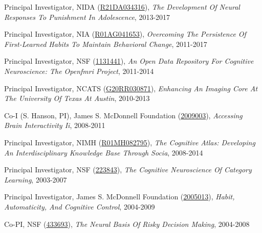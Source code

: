 Principal Investigator, NIDA (\href{http://projectreporter.nih.gov/project_info_description.cfm?aid=8662735}{R21DA034316}), \textit{The Development Of Neural Responses To Punishment In Adolescence}, 2013-2017 \vspace{2mm}

Principal Investigator, NIA (\href{http://projectreporter.nih.gov/project_info_description.cfm?aid=8968152}{R01AG041653}), \textit{Overcoming The Persistence Of First-Learned Habits To Maintain Behavioral Change}, 2011-2017 \vspace{2mm}

Principal Investigator, NSF (\href{http://grants.uberresearch.com/100000001/1131441/CRCNS-Data-Sharing-An-open-data-repository-for-cognitive-neuroscience-The-OpenfMRI-Project}{1131441}), \textit{An Open Data Repository For Cognitive Neuroscience: The Openfmri Project}, 2011-2014 \vspace{2mm}

Principal Investigator, NCATS (\href{http://projectreporter.nih.gov/project_info_description.cfm?aid=7934944}{G20RR030871}), \textit{Enhancing An Imaging Core At The University Of Texas At Austin}, 2010-2013 \vspace{2mm}

Co-I (S. Hanson, PI), James S. McDonnell Foundation (\href{https://www.jsmf.org/grants/2009003/}{2009003}), \textit{Accessing Brain Interactivity Ii}, 2008-2011 \vspace{2mm}

Principal Investigator, NIMH (\href{http://projectreporter.nih.gov/project_info_description.cfm?aid=8228112}{R01MH082795}), \textit{The Cognitive Atlas: Developing An Interdisciplinary Knowledge Base Through Socia}, 2008-2014 \vspace{2mm}

Principal Investigator, NSF (\href{http://grants.uberresearch.com/100000001/0223843/COLLABORATIVE-RESEARCH-The-Cognitive-Neuroscience-of-Category-Learning}{223843}), \textit{The Cognitive Neuroscience Of Category Learning}, 2003-2007 \vspace{2mm}

Principal Investigator, James S. McDonnell Foundation (\href{https://www.jsmf.org/grants/2005013/}{2005013}), \textit{Habit, Automaticity, And Cognitive Control}, 2004-2009 \vspace{2mm}

Co-PI, NSF (\href{http://grants.uberresearch.com/100000001/0433693/The-Neural-Basis-of-Risky-Decision-Making}{433693}), \textit{The Neural Basis Of Risky Decision Making}, 2004-2008 \vspace{2mm}

